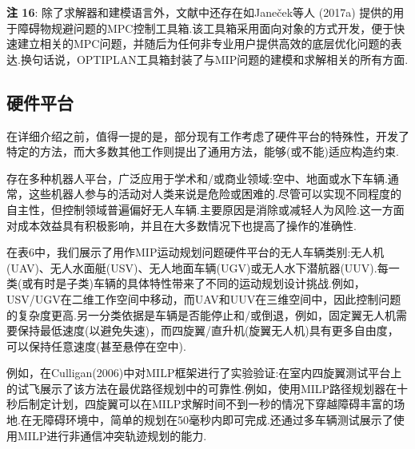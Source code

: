 \documentclass[10pt]{article}
\begin{document}
\vspace{1 em}
\noindent\textbf{注 16}: 除了求解器和建模语言外，文献中还存在如Janeček等人 (2017a) 提供的用于障碍物规避问题的MPC控制工具箱.该工具箱采用面向对象的方式开发，便于快速建立相关的MPC问题，并随后为任何非专业用户提供高效的底层优化问题的表达.换句话说，OPTIPLAN工具箱封装了与MIP问题的建模和求解相关的所有方面.
\vspace{1 em}


\subsection{硬件平台}
在详细介绍之前，值得一提的是，部分现有工作考虑了硬件平台的特殊性，开发了特定的方法，而大多数其他工作则提出了通用方法，能够(或不能)适应构造约束.

存在多种机器人平台，广泛应用于学术和/或商业领域:空中、地面或水下车辆.通常，这些机器人参与的活动对人类来说是危险或困难的.尽管可以实现不同程度的自主性，但控制领域普遍偏好无人车辆.主要原因是消除或减轻人为风险.这一方面对成本效益具有积极影响，并且在大多数情况下也提高了操作的准确性.

在表6中，我们展示了用作MIP运动规划问题硬件平台的无人车辆类别:无人机(UAV)、无人水面艇(USV)、无人地面车辆(UGV)或无人水下潜航器(UUV).每一类(或有时是子类)车辆的具体特性带来了不同的运动规划设计挑战.例如，USV/UGV在二维工作空间中移动，而UAV和UUV在三维空间中，因此控制问题的复杂度更高.另一分类依据是车辆是否能停止和/或倒退，例如，固定翼无人机需要保持最低速度(以避免失速)，而四旋翼/直升机(旋翼无人机)具有更多自由度，可以保持任意速度(甚至悬停在空中).

\begin{table}[h]
  \centering
  \caption{硬件平台的分类.}
\end{table}


例如，在Culligan(2006)中对MILP框架进行了实验验证:在室内四旋翼测试平台上的试飞展示了该方法在最优路径规划中的可靠性.例如，使用MILP路径规划器在十秒后制定计划，四旋翼可以在MILP求解时间不到一秒的情况下穿越障碍丰富的场地.在无障碍环境中，简单的规划在50毫秒内即可完成.还通过多车辆测试展示了使用MILP进行非通信冲突轨迹规划的能力.
\end{document}
